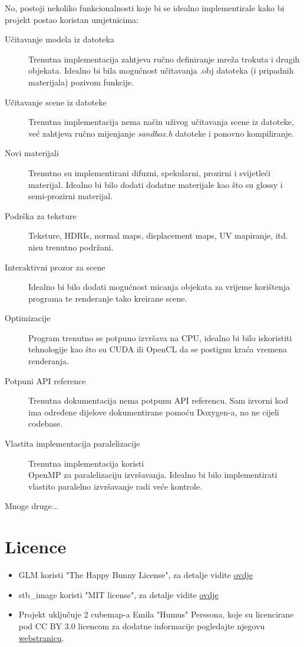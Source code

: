 \documentclass[
12pt, %
oneside, %
english, %
singlespacing, %
parskip, %
headsepline, %
chapterinoneline, %
consistentlayout, %
]{MastersDoctoralThesis} %
\begin{document}
No, postoji nekoliko funkcionalnosti koje bi se idealno implementirale kako bi projekt postao
koristan umjetnicima:
\begin{description}
	\item[Učitavanje modela iz datoteka] Trenutna implementacija zahtjeva ručno definiranje
		mreža trokuta i drugih objekata. Idealno bi bila mogućnost učitavanja .obj datoteka 
		(i pripadnih materijala) pozivom funkcije.
	\item[Učitavanje scene iz datoteke] Trenutna implementacija nema način uživog učitavanja
		scene iz datoteke, već zahtjeva ručno mijenjanje \emph{sandbox.h} datoteke i ponovno kompiliranje.
	\item[Novi materijali] Trenutno su implementirani difuzni, spekularni, prozirni i svijetleći
		materijal. Idealno bi bilo dodati dodatne materijale kao što su glossy i semi-prozirni
		materijal.
	\item[Podrška za teksture] Teksture, HDRIs, normal maps, displacement maps, UV mapiranje, itd.
		nisu trenutno podržani.
	\item[Interaktivni prozor za scene] Idealno bi bilo dodati mogućnost micanja objekata
		za vrijeme korištenja programa te renderanje tako kreirane scene.
	\item[Optimizacije] Program trenutno se potpuno izvršava na CPU, idealno bi bilo iskoristiti
		tehnologije kao što su CUDA ili OpenCL da se postignu kraća vremena renderanja.
	\item[Potpuni API reference] Trenutna dokumentacija nema potpunu API referencu. Sam izvorni 
		kod ima određene dijelove dokumentirane pomoću Doxygen-a, no ne cijeli codebase.
	\item[Vlastita implementacija paralelizacije] Trenutna implementacija koristi \\ 
		OpenMP za paralelizaciju izvršavanja. Idealno bi bilo implementirati vlastito 
		paralelno izvršavanje radi veće kontrole.
	\item[Mnoge druge...]
\end{description}






\chapter{Licence}

\begin{itemize}
	\item GLM koristi "The Happy Bunny License", za detalje vidite \href{https://github.com/g-truc/glm/blob/master/copying.txt}{ovdje}
	\item stb\_image koristi "MIT license", za detalje vidite \href{https://github.com/nothings/stb/blob/master/LICENSE}{ovdje}
	\item Projekt uključuje 2 cubemap-a Emila "Humus" Perssona, koje su licencirane pod CC BY 3.0 licencom
	      za dodatne informacije pogledajte njegovu \href{http://www.humus.name/index.php?page=Textures}{webstranicu}.
\end{itemize}
\end{document}

